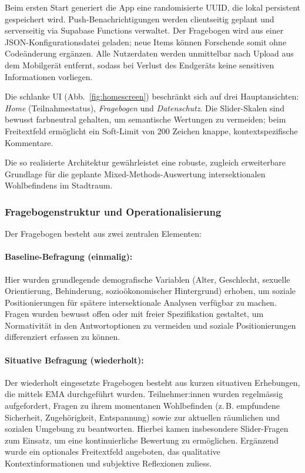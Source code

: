 Beim ersten Start generiert die App eine randomisierte UUID, die lokal persistent gespeichert wird. Push-Benachrichtigungen werden clientseitig geplant und serverseitig via Supabase Functions verwaltet. Der Fragebogen wird aus einer JSON-Konfigurationsdatei geladen; neue Items können Forschende somit ohne Codeänderung ergänzen. Alle Nutzerdaten werden unmittelbar nach Upload aus dem Mobilgerät entfernt, sodass bei Verlust des Endgeräts keine sensitiven Informationen vorliegen.

Die schlanke UI (Abb.~\ref{fig:homescreen}) beschränkt sich auf drei Hauptansichten: \textit{Home} (Teilnahmestatus), \textit{Fragebogen} und \textit{Datenschutz}. Die Slider-Skalen sind bewusst farbneutral gehalten, um semantische Wertungen zu vermeiden; beim Freitextfeld ermöglicht ein Soft-Limit von 200 Zeichen knappe, kontextspezifische Kommentare.

Die so realisierte Architektur gewährleistet eine robuste, zugleich erweiterbare Grundlage für die geplante Mixed-Methods-Auswertung intersektionalen Wohlbefindens im Stadtraum.


\subsubsection{Fragebogenstruktur und Operationalisierung}

Der Fragebogen besteht aus zwei zentralen Elementen:

\paragraph{Baseline-Befragung (einmalig):}
Hier wurden grundlegende demografische Variablen (Alter, Geschlecht, sexuelle Orientierung, Behinderung, sozioökonomischer Hintergrund) erhoben, um soziale Positionierungen für spätere intersektionale Analysen verfügbar zu machen. Fragen wurden bewusst offen oder mit freier Spezifikation gestaltet, um Normativität in den Antwortoptionen zu vermeiden und soziale Positionierungen differenziert erfassen zu können.

\paragraph{Situative Befragung (wiederholt):}
Der wiederholt eingesetzte Fragebogen besteht aus kurzen situativen Erhebungen, die mittels EMA durchgeführt wurden. Teilnehmer:innen wurden regelmässig aufgefordert, Fragen zu ihrem momentanen Wohlbefinden (z.\,B. empfundene Sicherheit, Zugehörigkeit, Entspannung) sowie zur aktuellen räumlichen und sozialen Umgebung zu beantworten. Hierbei kamen insbesondere Slider-Fragen zum Einsatz, um eine kontinuierliche Bewertung zu ermöglichen. Ergänzend wurde ein optionales Freitextfeld angeboten, das qualitative Kontextinformationen und subjektive Reflexionen zuliess.

